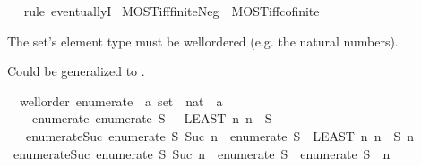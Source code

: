 \begin{isabellebody}
\isadelimproof
\ %
\endisadelimproof
%
\isatagproof
{}\isamarkupfalse%
\ {\isacharparenleft}rule\ eventuallyI{\isacharparenright}%
\endisatagproof
{\isafoldproof}%
%
\isadelimproof
%
\endisadelimproof
\isanewline
{}\isamarkupfalse%
\ MOST{\isacharunderscore}iff{\isacharunderscore}finiteNeg\ {\isacharequal}\ MOST{\isacharunderscore}iff{\isacharunderscore}cofinite%
\isadelimdocument
%
\endisadelimdocument
%
\isatagdocument
%
\isamarkuptrue%
%
\endisatagdocument
{\isafolddocument}%
%
\isadelimdocument
%
\endisadelimdocument
%
\begin{isamarkuptext}%
The set's element type must be wellordered (e.g. the natural numbers).%
\end{isamarkuptext}\isamarkuptrue%
%
\begin{isamarkuptext}%
Could be generalized to
    .%
\end{isamarkuptext}\isamarkuptrue%
\isamarkupfalse%
\ {\isacharparenleft}\ wellorder{\isacharparenright}\ enumerate\ {\isacharcolon}{\isacharcolon}\ {\isachardoublequoteopen}{\isacharprime}a\ set\ {\isasymRightarrow}\ nat\ {\isasymRightarrow}\ {\isacharprime}a{\isachardoublequoteclose}\isanewline
\ \ \isanewline
\ \ \ \ enumerate{\isacharunderscore}{}{\isacharcolon}\ {\isachardoublequoteopen}enumerate\ S\ {}\ {\isacharequal}\ {\isacharparenleft}LEAST\ n{\isachardot}\ n\ {\isasymin}\ S{\isacharparenright}{\isachardoublequoteclose}\isanewline
\ \ {\isacharbar}\ enumerate{\isacharunderscore}Suc{\isacharcolon}\ {\isachardoublequoteopen}enumerate\ S\ {\isacharparenleft}Suc\ n{\isacharparenright}\ {\isacharequal}\ enumerate\ {\isacharparenleft}S\ {\isacharminus}\ {\isacharbraceleft}LEAST\ n{\isachardot}\ n\ {\isasymin}\ S{\isacharbraceright}{\isacharparenright}\ n{\isachardoublequoteclose}\isanewline
\isanewline
{}\isamarkupfalse%
\ enumerate{\isacharunderscore}Suc{\isacharprime}{\isacharcolon}\ {\isachardoublequoteopen}enumerate\ S\ {\isacharparenleft}Suc\ n{\isacharparenright}\ {\isacharequal}\ enumerate\ {\isacharparenleft}S\ {\isacharminus}\ {\isacharbraceleft}enumerate\ S\ {}{\isacharbraceright}{\isacharparenright}\ n{\isachardoublequoteclose}\isanewline

\end{isabellebody}
